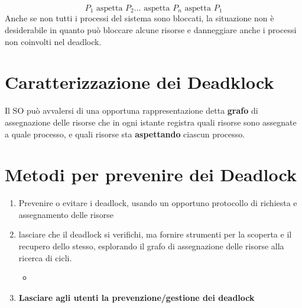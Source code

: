 \[
P_1 \text{ aspetta } P_2 \dots \text{ aspetta } P_n \text{ aspetta } P_1
\]
\noindent Anche se non tutti i processi del sistema sono bloccati, la situazione non è desiderabile in quanto può bloccare alcune risorse e danneggiare anche i processi non coinvolti nel deadlock.

\section{Caratterizzazione dei Deadklock}
Il SO può avvalersi di una opportuna rappresentazione detta \textbf{grafo} di assegnazione delle risorse che in ogni istante registra quali risorse sono assegnate a quale processo, e quali risorse sta \textbf{aspettando} ciascun processo.
\section{Metodi per prevenire dei Deadlock}
\begin{enumerate}
    \item Prevenire o evitare i deadlock, usando un opportuno protocollo di richiesta e assegnamento delle risorse
    \item lasciare che il deadlock si verifichi, ma fornire strumenti per la scoperta e il recupero dello stesso, esplorando il grafo di assegnazione delle risorse alla ricerca di cicli.
    \begin{itemize}
        \item {}
    \end{itemize}
    \item \textbf{Lasciare agli utenti la prevenzione/gestione dei deadlock}
\end{enumerate}